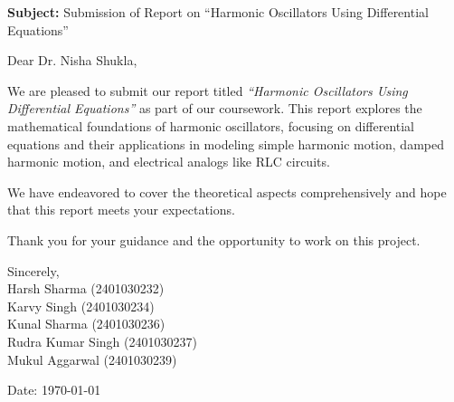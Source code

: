 \documentclass[12pt,a4paper]{article}
\begin{document}
\vspace{1cm}

\noindent
\textbf{Subject:} Submission of Report on ``Harmonic Oscillators Using Differential Equations''

\vspace{1cm}

\noindent
Dear Dr. Nisha Shukla,

\vspace{1em}

\noindent
We are pleased to submit our report titled \textit{``Harmonic Oscillators Using Differential Equations''} as part of our coursework. This report explores the mathematical foundations of harmonic oscillators, focusing on differential equations and their applications in modeling simple harmonic motion, damped harmonic motion, and electrical analogs like RLC circuits.

\vspace{1em}

\noindent
We have endeavored to cover the theoretical aspects comprehensively and hope that this report meets your expectations.

\vspace{1em}

\noindent
Thank you for your guidance and the opportunity to work on this project.

\vspace{2em}

\noindent
Sincerely, \\[2em]

\noindent
Harsh Sharma (2401030232)\\
Karvy Singh (2401030234)\\
Kunal Sharma (2401030236)\\
Rudra Kumar Singh (2401030237)\\
Mukul Aggarwal (2401030239)

\vspace{2cm}

\noindent
Date: \today

\newpage

\tableofcontents

\newpage
\end{document}
